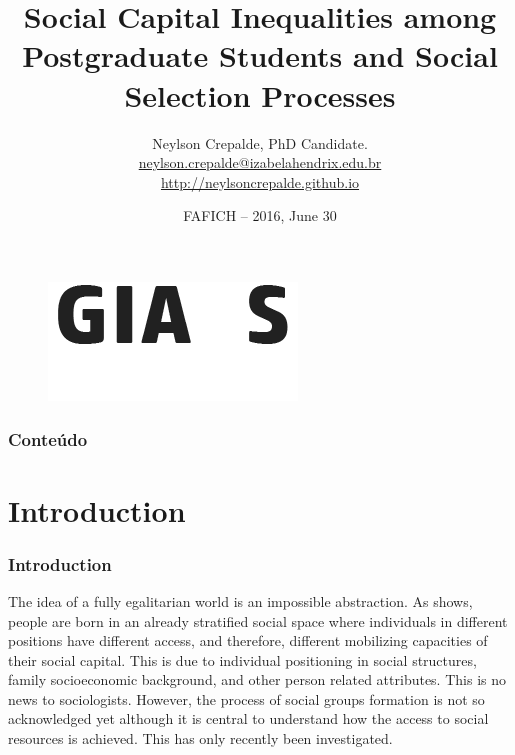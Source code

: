 \documentclass[compress]{beamer}
\title[Social Capital Inequalities]{Social Capital Inequalities among Postgraduate Students and Social Selection Processes}
\author[Neylson Crepalde]{
  Neylson Crepalde, PhD Candidate.  \\\medskip
  {\footnotesize \url{neylson.crepalde@izabelahendrix.edu.br}\\ 
  {\footnotesize \url{http://neylsoncrepalde.github.io}}}}
\institute[GIARS]{
  Grupo Interdisciplinar de Pesquisa em Análise de Redes Sociais \\ 
  Sociology Department -- UFMG}
\date[2016, June]{
  FAFICH -- 2016, June 30}
\begin{document}
\begin{frame}[plain]
  \titlepage
  
  
  

   \begin{figure}
    \flushbottom
    \includegraphics[scale=0.3, valign=t]{GIARS_logo2.png}
   \end{figure}




  
\end{frame}

\begin{frame}
  \frametitle{Conteúdo}

  \tableofcontents
\end{frame}



\section{Introduction}

\begin{frame}
  \frametitle{Introduction}

\justify

  The idea of a fully egalitarian world is an impossible abstraction. As  shows, people are born in an already stratified social space where individuals in different positions have different access, and therefore, different mobilizing capacities of their social capital. This is due to individual positioning in social structures, family socioeconomic background, and other person related attributes. This is no news to sociologists. However, the process of social groups formation is not so acknowledged yet although it is central to understand how the access to social resources is achieved. This has only recently been investigated.
 
\end{frame} 
\end{document}

